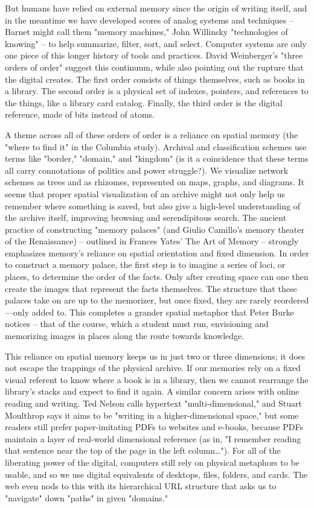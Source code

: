 But humans have relied on external memory since the origin of writing itself, and in the meantime we have developed scores of analog systems and techniques – Barnet might call them "memory machines," John Willinsky "technologies of knowing" – to help summarize, filter, sort, and select.  Computer systems are only one piece of this longer history of tools and practices. David Weinberger's "three orders of order" suggest this continuum, while also pointing out the rupture that the digital creates. The first order consists of things themselves, such as books in a library. The second order is a physical set of indexes, pointers, and references to the things, like a library card catalog. Finally, the third order is the digital reference, made of bits instead of atoms. 

A theme across all of these orders of order is a reliance on spatial memory (the "where to find it" in the Columbia study). Archival and classification schemes use terms like "border," "domain," and "kingdom" (is it a coincidence that these terms all carry connotations of politics and power struggle?). We visualize network schemes as trees and as rhizomes, represented on maps, graphs, and diagrams. It seems that proper spatial visualization of an archive might not only help us remember where something is saved, but also give a high-level understanding of the archive itself, improving browsing and serendipitous search.
The ancient practice of constructing "memory palaces" (and Giulio Camillo's memory theater of the Renaissance) – outlined in Frances Yates' The Art of Memory – strongly emphasizes memory's reliance on spatial orientation and fixed dimension.  In order to construct a memory palace, the first step is to imagine a series of loci, or places, to determine the order of the facts. Only after creating space can one then create the images that represent the facts themselves. The structure that these palaces take on are up to the memorizer, but once fixed, they are rarely reordered—only added to. This completes a grander spatial metaphor that Peter Burke notices – that of the course, which a student must run, envisioning and memorizing images in places along the route towards knowledge.

This reliance on spatial memory keeps us in just two or three dimensions; it does not escape the trappings of the physical archive. If our memories rely on a fixed visual referent to know where a book is in a library, then we cannot rearrange the library's stacks and expect to find it again. A similar concern arises with online reading and writing. Ted Nelson calls hypertext "multi-dimensional," and Stuart Moulthrop says it aims to be "writing in a higher-dimensional space,"  but some readers still prefer paper-imitating PDFs to websites and e-books, because PDFs maintain a layer of real-world dimensional reference (as in, "I remember reading that sentence near the top of the page in the left column…"). For all of the liberating power of the digital, computers still rely on physical metaphors to be usable, and so we use digital equivalents of desktops, files, folders, and cards. The web even nods to this with its hierarchical URL structure that asks us to "navigate" down "paths" in given "domains."

